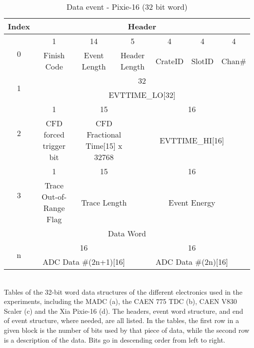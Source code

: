 \begin{landscape}
    \begin{table}[]
    \ContinuedFloat
    \begin{subtable}[]{1.3\textwidth}
    \small
    \centering
    \caption{\label{tab:word_XIA}Data event - Pixie-16 (32 bit word)}
    \begin{tabular}{c|c|c|c|c|c|c|c|c|c|c|c|c|c|c|c|c|c|c|c|c|c|c|c|c|c|c|c|c|c|c|c|c}
    \toprule
        Index & \multicolumn{32}{|c}{Header}\\
        \midrule
        \multirow{2}{*}{0} & 1 & \multicolumn{14}{|c|}{14} & \multicolumn{5}{|c|}{5} & \multicolumn{4}{|c|}{4} & \multicolumn{4}{|c|}{4} & \multicolumn{4}{|c}{4} \\
        \cline{2-33}
        & Finish Code & \multicolumn{14}{|c|}{Event Length} & \multicolumn{5}{|c|}{Header Length} & \multicolumn{4}{|c|}{CrateID} & \multicolumn{4}{|c|}{SlotID} & \multicolumn{4}{|c}{Chan\#} \\
        \midrule
        \multirow{2}{*}{1} & \multicolumn{32}{|c}{32} \\
        \cline{2-33}
        & \multicolumn{32}{|c}{EVTTIME\_LO[32]} \\
        \midrule
        \multirow{2}{*}{2} & 1 & \multicolumn{15}{|c|}{15} & \multicolumn{16}{|c}{16}\\
        \cline{2-33}
        & CFD forced trigger bit & \multicolumn{15}{|c|}{CFD Fractional Time[15] x 32768} & \multicolumn{16}{|c}{EVTTIME\_HI[16]} \\
        \midrule
        \multirow{2}{*}{3} & 1 & \multicolumn{15}{|c|}{15} & \multicolumn{16}{|c}{16}\\
        \cline{2-33}
        & Trace Out-of-Range Flag & \multicolumn{15}{|c|}{Trace Length} & \multicolumn{16}{|c}{Event Energy}\\
        \midrule
        \multicolumn{33}{c}{Data Word} \\
        \midrule
        \multirow{2}{*}{n} & \multicolumn{16}{|c|}{16} & \multicolumn{16}{|c}{16} \\
        \cline{2-33}
        & \multicolumn{16}{|c|}{ADC Data #(2n+1)[16]} & \multicolumn{16}{|c}{ADC Data #(2n)[16]} \\
        \bottomrule
    \end{tabular}
    \end{subtable}
    \\[2]
    \footnotesize
    Tables of the 32-bit word data structures of the different electronics used in the experiments, including the MADC (a), the CAEN 775 TDC (b), CAEN V830 Scaler (c) and the Xia Pixie-16 (d). The headers, event word structure, and end of event structure, where needed, are all listed. In the tables, the first row in a given block is the number of bits used by that piece of data, while the second row is a description of the data. Bits go in descending order from left to right.
\end{table}
\end{landscape}